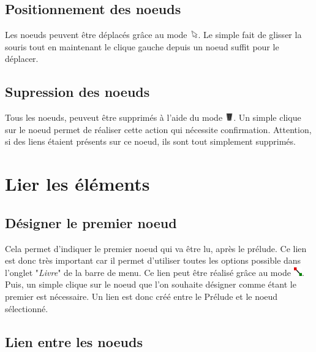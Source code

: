 		\subsection{Positionnement des noeuds}

			Les noeuds peuvent être déplacés grâce au mode \includegraphics[height=10pt]{img/icons/select.png}. Le simple fait de glisser la souris tout en maintenant le clique gauche depuis un noeud suffit pour le déplacer.

		\subsection{Supression des noeuds}

			Tous les noeuds, peuveut être supprimés à l'aide du mode \includegraphics[height=10pt, keepaspectratio]{img/icons/delete.png}. Un simple clique sur le noeud permet de réaliser cette action qui nécessite confirmation. Attention, si des liens étaient présents sur ce noeud, ils sont tout simplement supprimés.

	\section{Lier les éléments}
		\label{sec:lien}

		\subsection{Désigner le premier noeud}

			Cela permet d'indiquer le premier noeud qui va être lu, après le prélude. Ce lien est donc très important car il permet d'utiliser toutes les options possible dans l'onglet "\textit{Livre}" de la barre de menu. Ce lien peut être réalisé grâce au mode \includegraphics[height=10pt, keepaspectratio]{img/icons/first_node.png}. Puis, un simple clique sur le noeud que l'on souhaite désigner comme étant le premier est nécessaire. Un lien est donc créé entre le Prélude et le noeud sélectionné.

		\subsection{Lien entre les noeuds}

